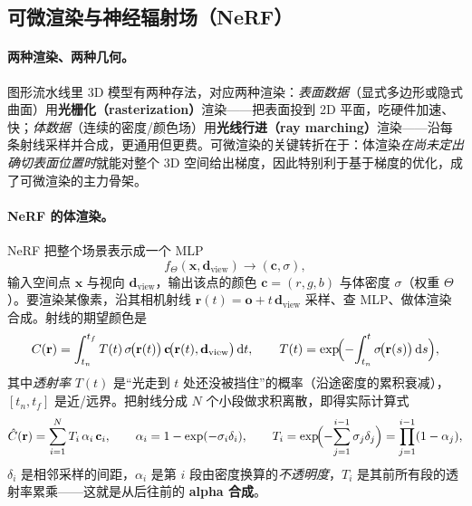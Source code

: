 \subsection{可微渲染与神经辐射场（NeRF）}
\label{sec:dense-radiance-nerf}

\paragraph{两种渲染、两种几何。}
图形流水线里 3D 模型有两种存法，对应两种渲染\cite{mildenhall2020nerf,kerbl2023gaussian}：\emph{表面数据}（显式多边形或隐式曲面）用\textbf{光栅化（rasterization）}渲染——把表面投到 2D 平面，吃硬件加速、快；\emph{体数据}（连续的密度/颜色场）用\textbf{光线行进（ray marching）}渲染——沿每条射线采样并合成，更通用但更费。可微渲染的关键转折在于：体渲染\emph{在尚未定出确切表面位置时}就能对整个 3D 空间给出梯度，因此特别利于基于梯度的优化，成了可微渲染的主力骨架。

\paragraph{NeRF 的体渲染。}
NeRF 把整个场景表示成一个 MLP
\begin{equation}
  f_{\Theta}(\mathbf{x},\mathbf{d}_{\mathrm{view}})\to(\mathbf{c},\sigma),
  \label{eq:dense-nerf-mlp}
\end{equation}
输入空间点 $\mathbf{x}$ 与视向 $\mathbf{d}_{\mathrm{view}}$，输出该点的颜色 $\mathbf{c}=(r,g,b)$ 与体密度 $\sigma$（权重 $\Theta$）。要渲染某像素，沿其相机射线 $\mathbf{r}(t)=\mathbf{o}+t\,\mathbf{d}_{\mathrm{view}}$ 采样、查 MLP、做体渲染合成。射线的期望颜色是
\begin{equation}
  C(\mathbf{r})=\int_{t_n}^{t_f}T(t)\,\sigma\!\bigl(\mathbf{r}(t)\bigr)\,\mathbf{c}\!\bigl(\mathbf{r}(t),\mathbf{d}_{\mathrm{view}}\bigr)\,\mathrm{d}t,
  \qquad
  T(t)=\exp\!\Bigl(-\!\int_{t_n}^{t}\sigma\!\bigl(\mathbf{r}(s)\bigr)\,\mathrm{d}s\Bigr),
  \label{eq:dense-nerf-integral}
\end{equation}
其中\emph{透射率} $T(t)$ 是“光走到 $t$ 处还没被挡住”的概率（沿途密度的累积衰减），$[t_n,t_f]$ 是近/远界。把射线分成 $N$ 个小段做求积离散，即得实际计算式
\begin{equation}
  \hat{C}(\mathbf{r})=\sum_{i=1}^{N}T_i\,\alpha_i\,\mathbf{c}_i,
  \qquad
  \alpha_i=1-\exp(-\sigma_i\delta_i),
  \qquad
  T_i=\exp\!\Bigl(-\!\sum_{j=1}^{i-1}\sigma_j\delta_j\Bigr)=\prod_{j=1}^{i-1}(1-\alpha_j),
  \label{eq:dense-nerf-quad}
\end{equation}
$\delta_i$ 是相邻采样的间距，$\alpha_i$ 是第 $i$ 段由密度换算的\emph{不透明度}，$T_i$ 是其前所有段的透射率累乘——这就是从后往前的 \textbf{alpha 合成}。

